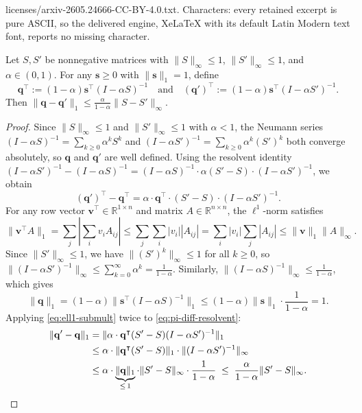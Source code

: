\documentclass[10pt,a4paper]{amsart}
\def\R{\mathbb{R}}
\def\tp{\intercal}
\newcommand{\arXivtag}[1][]{#1}
\newcommand{\norm}[1]{\| #1 \|}
\begin{document}
licenses/arxiv-2605.24666-CC-BY-4.0.txt. Characters: every retained excerpt is pure ASCII, so the delivered engine, XeLaTeX with its default Latin Modern text font, reports no missing character.
\begin{lemma}\label{lem:pagerank-perturbation}
	Let $S, S'$ be nonnegative matrices with $\|S\|_\infty \leq 1$,
	$\|S'\|_\infty \leq 1$, and $\alpha \in (0,1)$. For any
	$\mathbf{s} \geq 0$ with $\|\mathbf{s}\|_1 = 1$, define
	\[
	\mathbf{q}^\tp := (1-\alpha)\mathbf{s}^\tp(I-\alpha S)^{-1} \quad \arXivtag[\text{and}]
	\quad
	(\mathbf{q}')^\tp := (1-\alpha)\mathbf{s}^\tp(I-\alpha S')^{-1}.
	\]
	Then $\|\mathbf{q} - \mathbf{q}'\|_1 \leq
	\frac{\alpha}{1-\alpha}\|S - S'\|_\infty$.
\end{lemma}

\begin{proof}%
	Since $\|S\|_\infty \leq 1$ and $\|S'\|_\infty \leq 1$ with $\alpha < 1$,
	the Neumann series $(I-\alpha S)^{-1} = \sum_{k \geq 0}\alpha^k S^k$ and
	$(I-\alpha S')^{-1} = \sum_{k \geq 0}\alpha^k (S')^k$ both converge
	absolutely, so $\mathbf{q}$ and $\mathbf{q}'$ are well defined.
	Using the resolvent identity
	$(I - \alpha S')^{-1} - (I - \alpha S)^{-1}
	= (I - \alpha S)^{-1}\cdot \alpha(S' - S)\cdot (I - \alpha S')^{-1}$,
	we obtain
	\begin{equation}\label{eq:pi-diff-resolvent}
		(\mathbf{q}')^\tp - \mathbf{q}^\tp
		= \alpha \cdot \mathbf{q}^\tp \cdot (S' - S) \cdot (I - \alpha S')^{-1}.
	\end{equation}
	For any row vector $\mathbf{v}^\tp \in \R^{1 \times n}$ and matrix
	$A \in \R^{n \times n}$, the $\ell^1$-norm satisfies
	\begin{equation}\label{eq:ell1-submult}
		\norm{\mathbf{v}^\tp A}_1
		= \sum_j \left|\sum_i v_i A_{ij}\right|
		\leq \sum_j \sum_i |v_i| |A_{ij}|
		= \sum_i |v_i| \sum_j |A_{ij}|
		\leq \norm{\mathbf{v}}_1 \norm{A}_\infty.
	\end{equation}
	Since $\|S'\|_\infty \leq 1$, we have $\|(S')^k\|_\infty \leq 1$
	for all $k \geq 0$, so
	$\norm{(I - \alpha S')^{-1}}_\infty \leq \sum_{k=0}^\infty \alpha^k
	= \frac{1}{1-\alpha}$.
	Similarly, $\|(I-\alpha S)^{-1}\|_\infty \leq \frac{1}{1-\alpha}$,
	which gives
	\[
	\|\mathbf{q}\|_1
	= (1-\alpha)\|\mathbf{s}^\tp(I-\alpha S)^{-1}\|_1
	\leq (1-\alpha)\|\mathbf{s}\|_1 \cdot \frac{1}{1-\alpha} = 1.
	\]
	Applying \eqref{eq:ell1-submult} twice to \eqref{eq:pi-diff-resolvent}:
	\begin{align*}
		\norm{\mathbf{q}' - \mathbf{q}}_1
		&= \norm{\alpha \cdot \mathbf{q}^\tp(S' - S)(I - \alpha S')^{-1}}_1 \\
		&\leq \alpha \cdot \norm{\mathbf{q}^\tp(S'-S)}_1
		\cdot \norm{(I-\alpha S')^{-1}}_\infty \\
		&\leq \alpha \cdot \underbrace{\norm{\mathbf{q}}_1}_{\leq\,1}
		\cdot \norm{S' - S}_\infty \cdot \frac{1}{1-\alpha}
		\;\leq\; \frac{\alpha}{1-\alpha}\norm{S'-S}_\infty. \qedhere
	\end{align*}
\end{proof}
\end{document}
